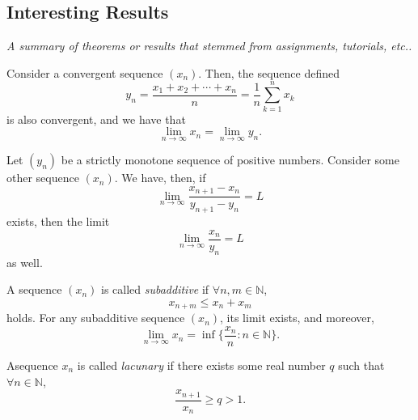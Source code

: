 \documentclass[12pt]{article}
\begin{document}
\subsection{Interesting Results}
\textit{A summary of theorems or results that stemmed from assignments, tutorials, etc..}

\begin{theorem}
  Consider a convergent sequence $(x_n)$. Then, the sequence defined \[y_n = \frac{x_1 + x_2 + \cdots +x_n}{n} = \frac{1}{n} \sum_{k=1}^{n} x_k\] is also convergent, and we have that \[\lim_{n\to\infty} x_n = \lim_{n\to\infty} y_n.\]
\end{theorem}
\begin{theorem}
  Let $(y_n)$ be a strictly monotone sequence of positive numbers. Consider some other sequence $(x_n)$. We have, then, if \[\lim_{n\to\infty} \frac{x_{n+1}-x_n}{y_{n+1}-y_n} = L\] exists, then the limit \[\lim_{n\to\infty} \frac{x_n}{y_n} = L\] as well.
\end{theorem}

\begin{lemma}
   A sequence $(x_n)$ is called \emph{subadditive} if $\forall n, m \in \mathbb{N}$, \[
   x_{n+m} \leq x_n + x_m 
   \]
   holds. For any subadditive sequence $(x_n)$, its limit exists, and moreover, \[
    \lim_{n\to\infty} x_n = \inf \{\frac{x_n}{n} : n \in \mathbb{N}\}.
   \]
\end{lemma}

\begin{definition}
  Asequence $x_n$ is called \emph{lacunary} if there exists some real number $q$ such that $\forall n \in \mathbb{N}$, \[
    \frac{x_{n+1}}{x_n} \geq q > 1.
  \]
\end{definition}

\end{document}
